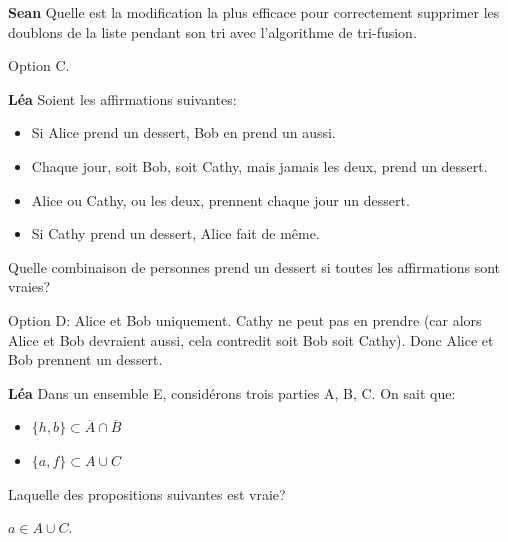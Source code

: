 \begin{Exercice}[5 minutes]\textbf{Sean}
Quelle est la modification la plus efficace pour correctement supprimer les doublons de la liste pendant son tri avec l'algorithme de tri-fusion. 

\begin{solution}
Option C. 
\end{solution}
\end{Exercice}

\begin{Exercice}[5 minutes]\textbf{Léa}
Soient les affirmations suivantes:

\begin{itemize}
\item Si Alice prend un dessert, Bob en prend un aussi.
\item Chaque jour, soit Bob, soit Cathy, mais jamais les deux, prend un dessert.
\item Alice ou Cathy, ou les deux, prennent chaque jour un dessert.
\item Si Cathy prend un dessert, Alice fait de même.
\end{itemize}

Quelle combinaison de personnes prend un dessert si toutes les affirmations sont vraies?


\begin{solution}
Option D: Alice et Bob uniquement. Cathy ne peut pas en prendre (car alors Alice et Bob devraient aussi, cela contredit soit Bob soit Cathy).
Donc Alice et Bob prennent un dessert.
\end{solution}

\end{Exercice}

\begin{Exercice}[5 minutes]\textbf{Léa}
Dans un ensemble E, considérons trois parties A, B, C. On sait que:

\begin{itemize}
\item $\{h, b\} \subset \overline{A} \cap \overline{B}$
\item $\{a, f\} \subset A \cup C$
\end{itemize}

Laquelle des propositions suivantes est vraie?


\begin{solution}
$a \in A \cup C$.
\end{solution}

\end{Exercice}

